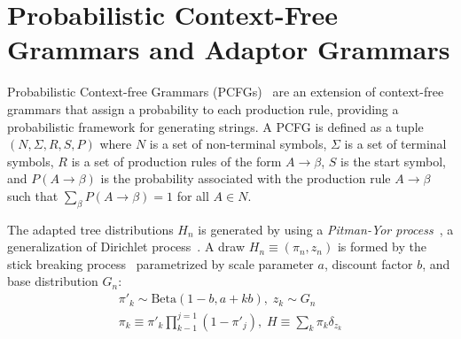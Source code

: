 
\section{Probabilistic Context-Free Grammars and Adaptor Grammars}
\label{sec:pcfg}
Probabilistic Context-free Grammars (PCFGs)~\citep{manning1999foundations} are an extension of context-free grammars that assign a probability to each production rule, providing a probabilistic framework for generating strings.
A PCFG is defined as a tuple $(N, \Sigma, R, S, P)$ where $N$ is a set of non-terminal symbols, $\Sigma$ is a set of terminal symbols, $R$ is a set of production rules of the form $A \rightarrow \beta$, $S$ is the start symbol, and $P(A \rightarrow \beta)$ is the probability associated with the production rule $A \rightarrow \beta$ such that $\sum_{\beta} P(A \rightarrow \beta) = 1$ for all $A \in N$.

The adapted tree distributions $H_{n}$ is generated by using a \textit{Pitman-Yor process}~\citep{pitman1997two},
a generalization of Dirichlet process~\citep{ferguson1973bayesian}. A draw $H_{n} \equiv (\pi_{n}, z_{n})$ is formed by the stick breaking process~\citep{sudderth2008shared} parametrized by scale parameter $a$, discount factor $b$, and base distribution $G_{n}$:
\begin{multline}
{\pi\prime}_{k} \sim \text{Beta}(1-b, a+kb), \; z_{k} \sim G_{n} \\
{\pi}_{k} \equiv {\pi\prime}_{k} {\textstyle \prod_{k-1}^{j=1}} (1- {\pi\prime}_{j}), \; H\equiv{\textstyle \sum_{k}^{}} \pi_{k}\delta_{z_{k}}
\end{multline}

